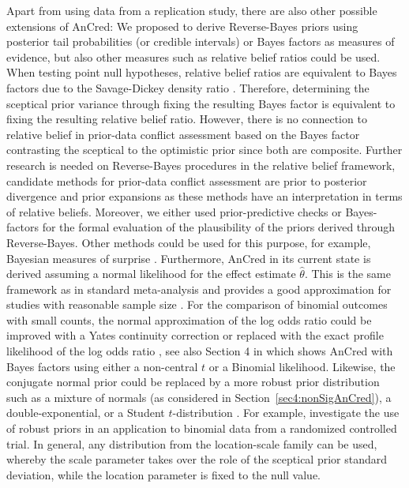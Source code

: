 Apart from using data from a replication study, there are also other possible
extensions of AnCred: We proposed to derive Reverse-Bayes priors using posterior
tail probabilities (or credible intervals) or Bayes factors as measures of
evidence, but also other measures such as relative belief ratios
\citep{Evans2015} could be used. When testing point null hypotheses, relative
belief ratios are equivalent to Bayes factors due to the Savage-Dickey density
ratio \citep[p. 98]{Evans2015}. Therefore, determining the sceptical prior
variance through fixing the resulting Bayes factor is equivalent to fixing the
resulting relative belief ratio. However, there is no connection to relative
belief in prior-data conflict assessment based on the Bayes factor contrasting
the sceptical to the optimistic prior since both are composite. Further research
is needed on Reverse-Bayes procedures in the relative belief framework,
candidate methods for prior-data conflict assessment are prior to posterior
divergence \citep{Nott2020} and prior expansions \citep{Nott2021} as these
methods have an interpretation in terms of relative beliefs. Moreover, we either
used prior-predictive checks \citep{Box1980, Evans2006} or Bayes-factors
\citep{Jeffreys1961, Kass1995} for the formal evaluation of the plausibility of
the priors derived through Reverse-Bayes. Other methods could be used for this
purpose, for example, Bayesian measures of surprise \citep{Bayarri2003}.
Furthermore, AnCred in its current state is derived assuming a normal likelihood
for the effect estimate $\hat{\theta}$. This is the same framework as in
standard meta-analysis and provides a good approximation for studies with
reasonable sample size \citep{Carlin1992}. For the comparison of binomial
outcomes with small counts, the normal approximation of the log odds ratio could
be improved with a Yates continuity correction \citep[section
2.4.1]{Spiegelhalter2004} or replaced with the exact profile likelihood of the
log odds ratio \citep[section 5.3]{Held2014}, see also Section 4 in
\citet{Pawel2020b} which shows AnCred with Bayes factors using either a
non-central $t$ or a Binomial likelihood. Likewise, the conjugate normal prior
could be replaced by a more robust prior distribution such as a mixture of
normals (as considered in Section~\ref{sec4:nonSigAnCred}), a
double-exponential, or a Student $t$-distribution \citep{Pericchi1992}. For
example, \citet{Fuquene2009} investigate the use of robust priors in an
application to binomial data from a randomized controlled trial. In general, any
distribution from the location-scale family can be used, whereby the scale
parameter takes over the role of the sceptical prior standard deviation, while
the location parameter is fixed to the null value.

